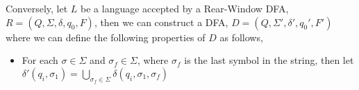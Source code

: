 \documentclass[12pt]{article}
\begin{document}
\begin{enumerate}
	Conversely, let $L$ be a language accepted by a Rear-Window DFA, $R = (Q, \Sigma, \delta, q_0, F)$, then we can construct a DFA, $D = (Q, \Sigma', \delta', q_0', F')$ where we can define the following properties of $D$ as follows,
	\begin{itemize}
		\item For each $\sigma \in \Sigma$ and $\sigma_f \in \Sigma$, where $\sigma_f$ is the last symbol in the string, then let $\delta'(q_i, \sigma_1) = \bigcup_{\sigma_f \in \Sigma}\delta(q_i, \sigma_1, \sigma_f)$
	\end{itemize}
\end{enumerate}
\end{document}
